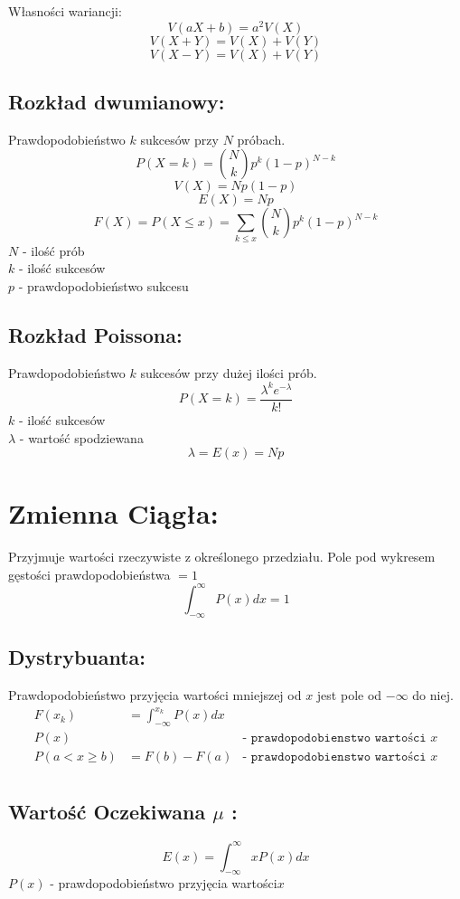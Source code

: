 \documentclass[fleqn,a4paper]{article}
\begin{document}
Własności wariancji:
\[V(aX+b)=a^2V(X)\]
\[V(X+Y)=V(X)+V(Y)\]
\[V(X-Y)=V(X)+V(Y)\]

\subsection{Rozkład dwumianowy:}
Prawdopodobieństwo $k$ sukcesów przy $N$ próbach.
\[P(X=k) = \binom{N}{k}p^k(1-p)^{N-k}\]
\[V(X)= Np(1-p)\]
\[E(X)=Np\]
\[F(X)=P(X \leq x) = \sum_{k \leq x}{\binom{N}{k}p^k(1-p)^{N-k}}\]
$N$ - ilość prób\\
$k$ - ilość sukcesów\\
$p$ - prawdopodobieństwo sukcesu

\subsection{Rozkład Poissona:}
Prawdopodobieństwo $k$ sukcesów przy dużej ilości prób.
\[P(X=k) = \frac{\lambda^ke^{-\lambda}}{k!}\]
$k$ - ilość sukcesów\\
$\lambda$ - wartość spodziewana
\[\lambda = E(x) = Np\]

\pagebreak
\section{Zmienna Ciągła:}
Przyjmuje wartości rzeczywiste z określonego przedziału.
Pole pod wykresem gęstości prawdopodobieństwa \(=1\)
\[\int_{-\infty}^{\infty}{P(x)dx}=1\]

\subsection{Dystrybuanta:}
Prawdopodobieństwo przyjęcia wartości mniejszej od $x$ jest pole od $-\infty$ do niej.
\begin{align*}
F(x_k)& = \int_{-\infty}^{x_k}{P(x)dx}\\
P(x) & & \texttt{- prawdopodobienstwo wartości }x\\
P(a < x \geq b)&= F(b)-F(a) &\texttt{- prawdopodobienstwo wartości }x\\
\end{align*}

\subsection{Wartość Oczekiwana \texorpdfstring{\(\mu\)}{E(X)} :}
\[E(x) = \int_{-\infty}^{\infty}{xP(x)dx}\]
$P(x)$ - prawdopodobieństwo przyjęcia wartości$x$
\end{document}

